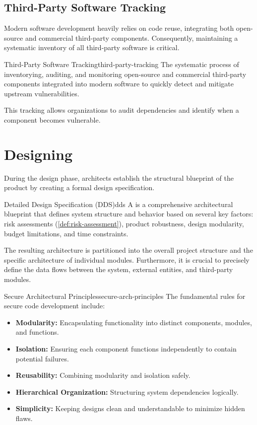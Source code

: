 \subsection{Third-Party Software Tracking}
Modern software development heavily relies on code reuse, integrating both open-source and commercial third-party components. Consequently, maintaining a systematic inventory of all third-party software is critical. 

\begin{concept}{Third-Party Software Tracking}{third-party-tracking}
    The systematic process of inventorying, auditing, and monitoring open-source and commercial third-party components integrated into modern software to quickly detect and mitigate upstream vulnerabilities.
\end{concept}

\noindent This tracking allows organizations to audit dependencies and identify when a component becomes vulnerable.

\section{Designing}
During the design phase, architects establish the structural blueprint of the product by creating a formal design specification.

\begin{definition}{Detailed Design Specification (DDS)}{dds}
    A  is a comprehensive architectural blueprint that defines system structure and behavior based on several key factors: risk assessments (\cref{def:risk-assessment}), product robustness, design modularity, budget limitations, and time constraints.
\end{definition}

\noindent The resulting architecture is partitioned into the overall project structure and the specific architecture of individual modules. Furthermore, it is crucial to precisely define the data flows between the system, external entities, and third-party modules.

\begin{concept}{Secure Architectural Principles}{secure-arch-principles}
    The fundamental rules for secure code development include:
    \begin{itemize}
        \item \textbf{Modularity:} Encapsulating functionality into distinct components, modules, and functions.
        \item \textbf{Isolation:} Ensuring each component functions independently to contain potential failures.
        \item \textbf{Reusability:} Combining modularity and isolation safely.
        \item \textbf{Hierarchical Organization:} Structuring system dependencies logically.
        \item \textbf{Simplicity:} Keeping designs clean and understandable to minimize hidden flaws.
    \end{itemize}
\end{concept}

